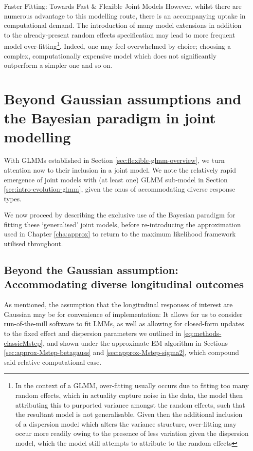 \begin{chapter}{\label{cha:flexible}Faster Fitting: Towards Fast \& Flexible Joint Models}
However, whilst there are numerous advantage to this modelling route, there is an accompanying uptake in computational demand. The introduction of many model extensions in addition to the already-present random effects specification may lead to more frequent model over-fitting\footnote{In the context of a GLMM, over-fitting usually occurs due to fitting too many random effects, which in actuality capture noise in the data, the model then attributing this to purported variance amongst the random effects, such that the resultant model is not generalisable. Given then the additional inclusion of a dispersion model which alters the variance structure, over-fitting may occur more readily owing to the presence of less variation given the dispersion model, which the model still attempts to attribute to the random effects}. Indeed, one may feel overwhelmed by choice; choosing a complex, computationally expensive model which does not significantly outperform a simpler one and so on.

\section{Beyond Gaussian assumptions and the Bayesian paradigm in joint modelling}\label{sec:flexible-intro}
With GLMMs established in Section \ref{sec:flexible-glmm-overview}, we turn attention now to their inclusion in a joint model. We note the relatively rapid emergence of joint models with (at least one) GLMM sub-model in Section \ref{sec:intro-evolution-glmm}, given the onus of accommodating diverse response types. 

We now proceed by describing the exclusive use of the Bayesian paradigm for fitting these `generalised' joint models, before re-introducing the approximation used in Chapter \ref{cha:approx} to return to the maximum likelihood framework utilised throughout.

\subsection{Beyond the Gaussian assumption: Accommodating diverse longitudinal outcomes}\label{sec:flexible-intro-gaussian}
As mentioned, the assumption that the longitudinal responses of interest are Gaussian may be for convenience of implementation: It allows for us to consider run-of-the-mill software to fit LMMs, as well as allowing for closed-form updates to the fixed effect and dispersion parameters we outlined in \eqref{eq:methods-classicMstep}, and shown under the approximate EM algorithm in Sections \ref{sec:approx-Mstep-betagauss} and \ref{sec:approx-Mstep-sigma2}, which compound said relative computational ease.


\end{chapter}
